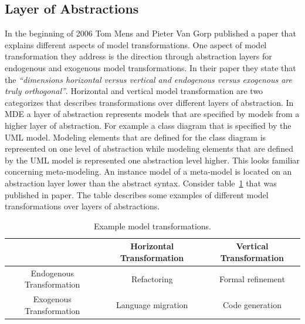\subsection{Layer of Abstractions}
\label{sec:abstraction_layer}

In the beginning of 2006 Tom Mens and Pieter Van Gorp published a
paper\cite{Mens2006} that explains different aspects of model transformations.
One aspect of model transformation they address is the direction through
abstraction layers for endogenous and exogenous model transformations. In their
paper they state that the \textit{``dimensions horizontal versus vertical and
endogenous versus exogenous are truly orthogonal''}\cite{Mens2006}. Horizontal
and vertical model transformation are two categorizes that describes
transformations over different layers of abstraction. In MDE a layer of
abstraction represents models that are specified by models from a higher layer
of abstraction. For example a class diagram that is specified by the UML model.
Modeling elements that are defined for the class diagram is represented on one
level of abstraction while modeling elements that are defined by the UML model
is represented one abstraction level higher. This looks familiar concerning
meta-modeling. An instance model of a meta-model is located on an abstraction
layer lower than the abstract syntax. Consider table~\ref{tab:directions_mt}
that was published in paper\cite{Mens2006}. The table describes some examples
of different model transformations over layers of abstractions.

\begin{table}[ht]
\renewcommand*\arraystretch{1.2}
\centering
\begin{tabular}{| c | c | c |}
\hline

& Horizontal Transformation & Vertical Transformation \\ [0.5ex] 
\hline
Endogenous Transformation & Refactoring & Formal refinement \\ [0.5ex] 
Exogenous Transformation & Language migration & Code generation \\ [0.5ex]
 
\hline
\end{tabular}
\caption{Example model transformations.}
\label{tab:directions_mt}
\end{table} 

